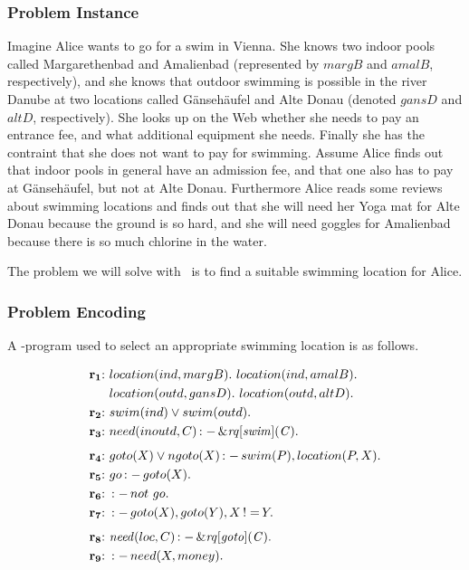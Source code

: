 \documentclass[a4paper, titlepage]{article}
\newcommand{\ext}[3]{\ensuremath{\&{\mathit{#1}}[#2](#3)}}
\DeclareMathOperator{\leftimpl}{:-}
\DeclareMathOperator{\noteq}{!=}
\newcommand{\rowprefix}[1]{%
  \ensuremath{\color{black}\mathbf{#1{:}}\ }%
}
\begin{document}
\subsubsection{Problem Instance}
Imagine Alice wants to go for a swim in Vienna. She knows 
two indoor pools called Margarethenbad and Amalienbad 
(represented by $\mathit{margB}$ and $\mathit{amalB}$, 
respectively), and she knows that outdoor swimming is 
possible in the river Danube at two locations called 
G\"anseh\"aufel and Alte Donau (denoted $\mathit{gansD}$ and 
$\mathit{altD}$, respectively). She looks up on the Web 
whether she needs to pay an entrance fee, and what 
additional equipment she needs. Finally she has the 
contraint that she does not want to pay for swimming. 
Assume Alice finds out that indoor pools in general have an 
admission fee, and that one also
has to pay at G\"anseh\"aufel, but not at Alte Donau. 
Furthermore Alice reads some reviews about swimming 
locations and finds out that she will need her Yoga mat for 
Alte Donau because the ground is so hard, and she will need 
goggles for Amalienbad because there is so much chlorine in 
the water.

The problem we will solve with \hex\ is
to find a suitable swimming location for Alice.

\subsubsection{Problem Encoding}

A \hex-program used to select
an appropriate swimming location is as follows.

\begin{align*}
\rowprefix{r_1}& location(ind, margB). \ location(ind, amalB). \ \\& 
location(outd, gansD). \ location(outd, altD). \\  
\rowprefix{r_2}& swim(ind) \vee swim(outd).\\ 
\rowprefix{r_3}& need(inoutd, C) \leftimpl \ext{\mathit{rq}}
{\mathit{swim}}{\mathit{C}}. \\[1ex]
\rowprefix{r_4}& goto(X) \vee ngoto(X) \leftimpl swim(P), 
location(P, X).\\
\rowprefix{r_5}& go \leftimpl goto(X).\\
\rowprefix{r_6}& \leftimpl not \ go. \\
\rowprefix{r_7}& \leftimpl goto(X), goto(Y), X \noteq Y. \\[1ex]
\rowprefix{r_8}& \mathit{need}(loc, C) \leftimpl 
\ext{\mathit{rq}}{\mathit{goto}}{\mathit{C}}. \\ 
\rowprefix{r_9}& \leftimpl need(X, money).
\end{align*}
\end{document}
